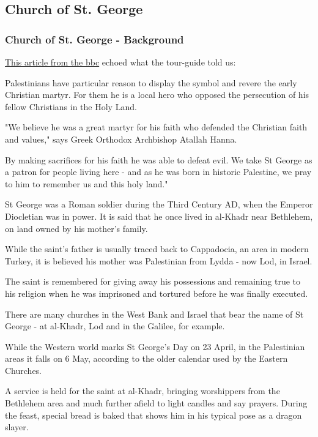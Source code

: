 \documentclass[letterpaper]{report}
\begin{document}
\subsection{Church of St. George}
\begin{multicols}{2}
\subsubsection{Church of St. George - Background}
\href{http://www.bbc.com/news/magazine-27048219}{
This article from the bbc}
echoed what the tour-guide told us:

Palestinians have particular reason to display the symbol and revere the early Christian martyr. For them he is a local hero who opposed the persecution of his fellow Christians in the Holy Land.

"We believe he was a great martyr for his faith who defended the Christian faith and values," says Greek Orthodox Archbishop Atallah Hanna.

By making sacrifices for his faith he was able to defeat evil. We take St George as a patron for people living here - and as he was born in historic Palestine, we pray to him to remember us and this holy land."

St George was a Roman soldier during the Third Century AD, when the Emperor Diocletian was in power. It is said that he once lived in al-Khadr near Bethlehem, on land owned by his mother's family.

While the saint's father is usually traced back to Cappadocia, an area in modern Turkey, it is believed his mother was Palestinian from Lydda - now Lod, in Israel.

The saint is remembered for giving away his possessions and remaining true to his religion when he was imprisoned and tortured before he was finally executed.

There are many churches in the West Bank and Israel that bear the name of St George - at al-Khadr, Lod and in the Galilee, for example.

While the Western world marks St George's Day on 23 April, in the Palestinian areas it falls on 6 May, according to the older calendar used by the Eastern Churches.

A service is held for the saint at al-Khadr, bringing worshippers from the Bethlehem area and much further afield to light candles and say prayers. During the feast, special bread is baked that shows him in his typical pose as a dragon slayer.


\end{multicols}
\end{document}
